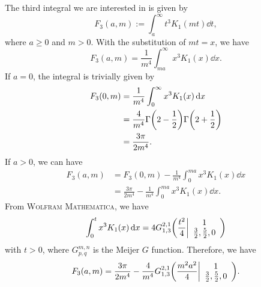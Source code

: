 \documentclass{article}
\begin{document}
            The third integral we are interested in is given by
            \begin{equation}
                F_3(a, m) := \int_{a}^\infty t^3 K_1(m t) \dd{t},
                \label{eq:F_3-definition}
            \end{equation}
            where $a \ge 0$ and $m > 0$.
            With the substitution of $m t = x$, we have
            \begin{equation}
                F_3(a, m) = \frac{1}{m^4} \int_{m a}^\infty x^3 K_1(x) \dd{x}.
            \end{equation}
            If $a = 0$, the integral is trivially given by \cite[Eq.~(\href{https://dlmf.nist.gov/10.43.19}{10.43.19})]{NIST:DLMF}
            \begin{equation}
                \begin{aligned}
                    F_3(0, m) & = \frac{1}{m^4} \int_0^\infty x^3 K_1(x) \dd{x} \\
                    & = \frac{4}{m^4} \Gamma\qty(2 - \frac{1}{2}) \Gamma\qty(2 + \frac{1}{2}) \\
                    & = \frac{3 \pi}{2 m^4}.
                \end{aligned}
            \end{equation}
            If $a > 0$, we can have
            \begin{equation}
                \begin{aligned}
                    F_3(a, m) & = F_3(0, m) - \frac{1}{m^4} \int_0^{m a} x^3 K_1(x) \dd{x} \\
                    & = \frac{3 \pi}{2 m^4} - \frac{1}{m^4} \int_0^{m a} x^3 K_1(x) \dd{x}.
                \end{aligned}
            \end{equation}
            From \textsc{Wolfram Mathematica}, we have
            \begin{equation}
                \int_0^t x^3 K_1(x) \dd{x} = 4 G^{2,1}_{1,3}\qty(\frac{t^2}{4} \middle| \begin{array}{c} 1 \\ \frac{3}{2}, \frac{5}{2}, 0 \end{array} )
            \end{equation}
            with $t > 0$, where $G^{m,n}_{p,q}$ is the Meijer $G$ function.
            Therefore, we have
            \begin{equation}
                F_3(a, m) = \frac{3 \pi}{2 m^4} - \frac{4}{m^4} G^{2,1}_{1,3}\qty(\frac{m^2 a^2}{4} \middle| \begin{array}{c} 1 \\ \frac{3}{2}, \frac{5}{2}, 0 \end{array} ).
                \label{eq:F_3-evaluation}
            \end{equation}

    \printbibliography[heading=bibintoc]
\end{document}
